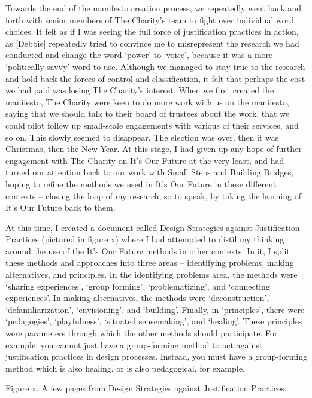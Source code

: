 Towards the end of the manifesto creation process, we repeatedly went back and forth with senior members of The Charity’s team to fight over individual word choices. It felt as if I was seeing the full force of justification practices in action, as [Debbie] repeatedly tried to convince me to misrepresent the research we had conducted and change the word ‘power’ to ‘voice’, because it was a more ‘politically savvy’ word to use. Although we managed to stay true to the research and hold back the forces of control and classification, it felt that perhaps the cost we had paid was losing The Charity’s interest. When we first created the manifesto, The Charity were keen to do more work with us on the manifesto, saying that we should talk to their board of trustees about the work, that we could pilot follow up small-scale engagements with various of their services, and so on. This slowly seemed to disappear. The election was over, then it was Christmas, then the New Year. At this stage, I had given up any hope of further engagement with The Charity on It’s Our Future at the very least, and had turned our attention back to our work with Small Steps and Building Bridges, hoping to refine the methods we used in It’s Our Future in these different contexts – closing the loop of my research, so to speak, by taking the learning of It’s Our Future back to them. 

At this time, I created a document called Design Strategies against Justification Practices (pictured in figure x) where I had attempted to distil my thinking around the use of the It’s Our Future methods in other contexts. In it, I split these methods and approaches into three areas – identifying problems, making alternatives, and principles. In the identifying problems area, the methods were ‘sharing experiences’, ‘group forming’, ‘problematizing’, and ‘connecting experiences’. In making alternatives, the methods were ‘deconstruction’, ‘defamiliarization’, ‘envisioning’, and ‘building’. Finally, in ‘principles’, there were ‘pedagogies’, ‘playfulness’, ‘situated sensemaking’, and ‘healing’. These principles were parameters through which the other methods should participate. For example, you cannot just have a group-forming method to act against justification practices in design processes. Instead, you must have a group-forming method which is also healing, or is also pedagogical, for example. 

Figure x. A few pages from Design Strategies against Justification Practices. 


